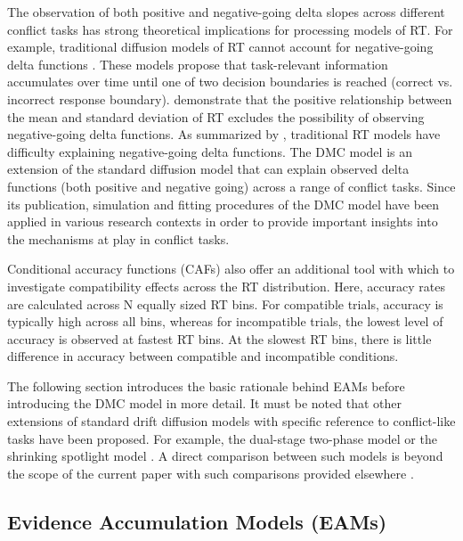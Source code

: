 The observation of both positive and negative-going delta slopes across
different conflict tasks has strong theoretical implications for processing
models of RT. For example, traditional diffusion models of RT cannot account
for negative-going delta functions \parencite{pratte2010exploring}. These
models propose that task-relevant information accumulates over time until one
of two decision boundaries is reached (correct vs. incorrect response
boundary). \textcite{wagenmakers2007linear} demonstrate that the positive
relationship between the mean and standard deviation of RT excludes the
possibility of observing negative-going delta functions. As summarized by
\textcite{ulrich2015automatic}, traditional RT models have difficulty
explaining negative-going delta functions. The DMC model is an extension of the
standard diffusion model that can explain observed delta functions (both
positive and negative going) across a range of conflict tasks. Since its
publication, simulation and fitting procedures of the DMC model have been
applied in various research contexts in order to provide important insights into
the mechanisms at play in conflict tasks\parencite[e.g.,][]{servant2016,
mittelstadt2020beyond}.

Conditional accuracy functions (CAFs) also offer an additional tool with which
to investigate compatibility effects across the RT distribution. Here, accuracy
rates are calculated across N equally sized RT bins. For compatible trials,
accuracy is typically high across all bins, whereas for incompatible trials,
the lowest level of accuracy is observed at fastest RT bins. At the slowest RT
bins, there is little difference in accuracy between compatible and
incompatible conditions.

The following section introduces the basic rationale behind EAMs before
introducing the DMC model \textcite{ulrich2015automatic} in more detail. It
must be noted that other extensions of standard drift diffusion models with
specific reference to conflict-like tasks have been proposed. For example, the
dual-stage two-phase model \parencite[DSTP, ][]{hubner2010dual} or the
shrinking spotlight model \parencite[SSP, ][]{white2011diffusion}. A direct
comparison between such models is beyond the scope of the current paper with
such comparisons provided elsewhere \parencite[see][albeit with specific
reference to the flanker task only]{white2018testing, evans2020comparison}.

\subsection{Evidence Accumulation Models (EAMs)} 

